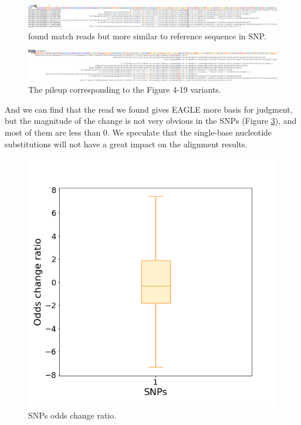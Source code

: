 \begin{figure}[H]
    \centering
    \includegraphics[width=1\columnwidth]{body/image/snp_new_REFread.png}
    \captionsetup{labelfont=bf}
    \renewcommand{\baselinestretch}{1.0}
    \vspace{-1cm}
    \caption[SNP worse match reads]{ found match reads but more similar to reference sequence in SNP.}
    \label{snp_new_REFread}
\end{figure}

\vspace{0.5cm}
\begin{figure}[H]
    \centering
    \includegraphics[width=1\columnwidth]{body/image/snp_pileup_REFread.png}
    \captionsetup{labelfont=bf}
    \renewcommand{\baselinestretch}{1.0}
    \vspace{-1cm}
    \caption[SNP worse match reads pileup]{The pileup corresponding to the Figure 4-19 variants.}
    \label{snp_pileup_REFread}
\end{figure}

And we can find that the read we found gives EAGLE more basis for judgment, but the magnitude of the change is not very obvious in the SNPs (Figure \ref{snp_odds_change}), and most of them are less than 0. We speculate that the single-base nucleotide substitutions will not have a great impact on the alignment results.

\vspace{1cm}
\begin{figure}[H]
    \centering
    \includegraphics[width=0.6\columnwidth]{body/image/snp_odds_change.png}
    \captionsetup{labelfont=bf}
    \renewcommand{\baselinestretch}{1.0}
    \caption[SNPs odds change ratio]{SNPs odds change ratio.}
    \label{snp_odds_change}
\end{figure}

